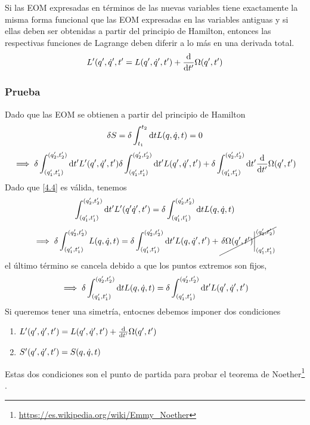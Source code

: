 \begin{teor}
	Si las EOM expresadas en términos de las nuevas variables tiene exactamente la misma forma funcional que las EOM expresadas en las variables antiguas y si ellas deben ser obtenidas a partir del principio de Hamilton, entonces las respectivas funciones de Lagrange deben diferir a lo más en una derivada total.
	\begin{equation}
  L'(q',\dot{q}',t'=L(q',\dot{q}',t')+\dv{t'}\Omega(q',t')
\end{equation}
\end{teor}

\subsubsection*{Prueba}
Dado que las EOM se obtienen a partir del principio de Hamilton
\begin{equation}
  \delta S=\delta \int_{t_1}^{t_2}\dd t L(q,\dot{q},t)=0
\end{equation}
\begin{equation}
  \implies \delta\int_{(q_1',t_1')}^{(q_2',t_2')}\dd t' L'(q',\dot{q}',t')\delta\int_{(q_1',t_1')}^{(q_2',t_2')}\dd t' L(q',\dot{q}',t')+\delta\int_{(q_1',t_1')}^{(q_2',t_2')}\dd t'\dv{t'}\Omega(q',t')
\end{equation}
Dado que \eqref{4.4} es válida, tenemos
\begin{equation}
  \int_{(q_1',t_1')}^{(q_2',t_2')}\dd t' L'(q'\dot{q}',t')=\delta\int_{(q_1',t_1')}^{(q_2',t_2')}\dd tL(q,\dot{q},t)
\end{equation}
\begin{equation}
  \implies \d\int_{(q_1',t_1')}^{(q_2',t_2')} L(q,\qd,t)=\d\int_{(q_1',t_1')}^{(q_2',t_2')}\dd t' L(q,\qdp,t')+\cancel{\eval{\d\Omega(q',t')}_{(q_1',t_1')}^{(q_2',t_2')}}
\end{equation}
el último término se cancela debido a que los puntos extremos son fijos,
\begin{equation}
  \implies \delta\int_{(q_1',t_1')}^{(q_2',t_2')}\dd tL(q,\dot{q},t)=\delta\int_{(q_1',t_1')}^{(q_2',t_2')}\dd t' L(q',\dot{q}',t')
\end{equation}
Si queremos tener una simetría, entocnes debemos imponer dos condiciones
\begin{enumerate}
	\item $L'(q',\dot{q}',t')=L(q',\dot{q}',t')+\dv{t'}\Omega(q',t')$
	\item $S'(q',\dot{q}',t')=S(q,\dot{q},t)$
\end{enumerate}
Estas dos condiciones son el punto de partida para probar el teorema de Noether\footnote{\url{https://es.wikipedia.org/wiki/Emmy_Noether}} .























